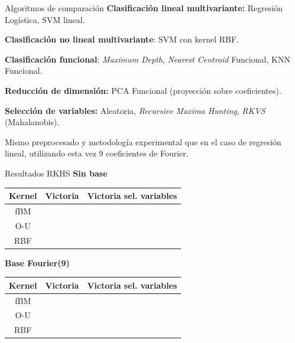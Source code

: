 \documentclass[10pt, spanish, professionalfonts]{beamer}
\newcommand{\cmark}{\ding{51}}%
\newcommand{\xmark}{\ding{55}}%
\begin{document}
\begin{frame}{Algoritmos de comparación}
  \textbf{Clasificación lineal multivariante:} Regresión Logística, SVM lineal.

  \textbf{Clasificación no lineal multivariante}: SVM con kernel RBF.

  \textbf{Clasificación funcional}: \textit{Maximum Depth}, \textit{Nearest Centroid} Funcional, KNN Funcional.

  \textbf{Reducción de dimensión:} PCA Funcional (proyección sobre coeficientes).

  \textbf{Selección de variables:} Aleatoria, \textit{Recursive Maxima Hunting}, \textit{RKVS} (Mahalanobis).

  \vspace{1em}

  Mismo preprocesado y metodología experimental que en el caso de regresión lineal, utilizando esta vez 9 coeficientes de Fourier.
\end{frame}

\begin{frame}{Resultados RKHS}
\textbf{Sin base}
  \begin{table}
    \begin{tabular}{c|cc}
      Kernel & Victoria & Victoria sel. variables \\ \hline
      fBM & \xmark & \xmark\\
      O-U & \xmark & \cmark\\
      RBF & \cmark & \xmark
    \end{tabular}
  \end{table}

  \textbf{Base Fourier(9)}
  \begin{table}
    \begin{tabular}{c|cc}
      Kernel & Victoria & Victoria sel. variables \\ \hline
      fBM & \cmark &  \cmark\\
      O-U & \cmark & \cmark\\
      RBF & \cmark & \cmark
    \end{tabular}
  \end{table}
\end{frame}
\end{document}
